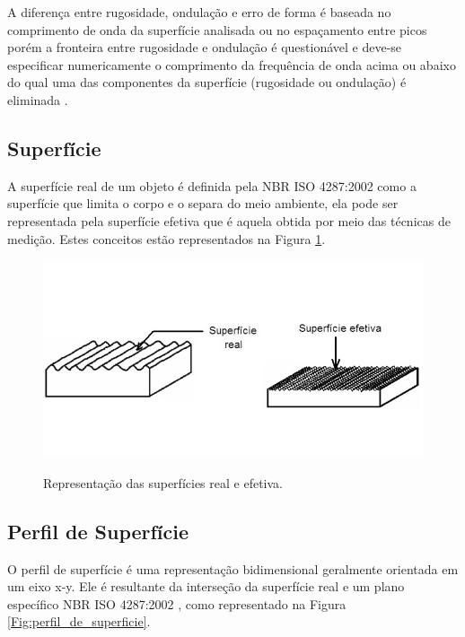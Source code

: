 A diferença entre rugosidade, ondulação e erro de forma é baseada no comprimento de onda da superfície analisada ou no espaçamento entre picos  porém a fronteira entre rugosidade e ondulação é questionável e deve-se especificar numericamente o comprimento da frequência de onda acima ou abaixo do qual uma das componentes da superfície (rugosidade ou ondulação) é eliminada \cite{machado}. 

\subsection{Superfície}
A superfície real de um objeto é definida pela NBR ISO 4287:2002 \nocite{iso4287} como a superfície que limita o corpo e o separa do meio ambiente, ela pode ser representada pela superfície efetiva que é aquela obtida por meio das técnicas de medição. Estes conceitos estão representados na Figura \ref{Fig:superficie}.

\begin{figure}[!ht]
\centering
\caption{Representação das superfícies real e efetiva.} 
{\includegraphics[scale=.65]{figures/superficie.jpg}}\\
 \label{Fig:superficie}
\end{figure}

\subsection{Perfil de Superfície}
O perfil de superfície é uma representação bidimensional geralmente orientada em um eixo x-y. Ele é resultante da interseção da superfície real e um plano específico NBR ISO 4287:2002 \nocite{iso4287}, como representado na Figura \ref{Fig:perfil_de_superficie}.

